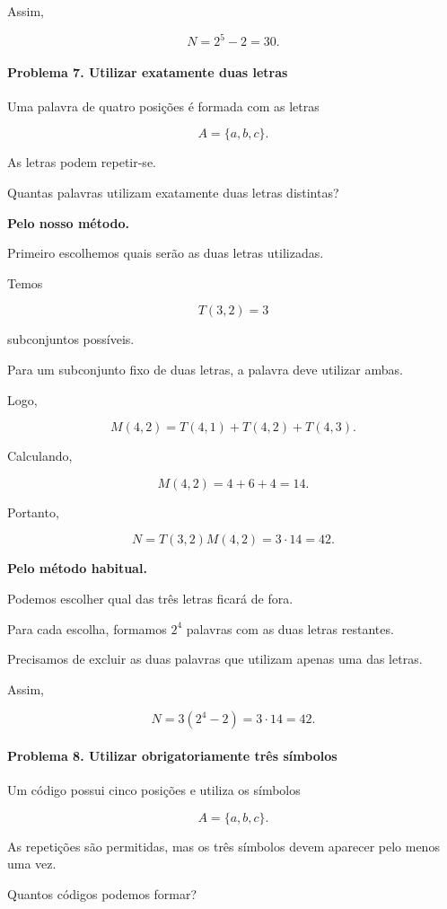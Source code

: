 \documentclass[11pt,a4paper,oneside]{book}
\begin{document}
Assim,

\[
N=2^5-2=\boxed{30}.
\]

\paragraph{Problema 7. Utilizar exatamente duas letras}

Uma palavra de quatro posições é formada
com as letras

\[
A=\{a,b,c\}.
\]

As letras podem repetir-se.

Quantas palavras utilizam exatamente
duas letras distintas?

\textbf{Pelo nosso método.}

Primeiro escolhemos quais serão
as duas letras utilizadas.

Temos

\[
T(3,2)=3
\]

subconjuntos possíveis.

Para um subconjunto fixo de duas letras,
a palavra deve utilizar ambas.

Logo,

\[
M(4,2)=T(4,1)+T(4,2)+T(4,3).
\]

Calculando,

\[
M(4,2)=4+6+4=14.
\]

Portanto,

\[
N=T(3,2)M(4,2)=3\cdot14=\boxed{42}.
\]

\textbf{Pelo método habitual.}

Podemos escolher qual das três letras
ficará de fora.

Para cada escolha, formamos $2^4$
palavras com as duas letras restantes.

Precisamos de excluir as duas palavras
que utilizam apenas uma das letras.

Assim,

\[
N=3(2^4-2)=3\cdot14=\boxed{42}.
\]

\paragraph{Problema 8. Utilizar obrigatoriamente três símbolos}

Um código possui cinco posições
e utiliza os símbolos

\[
A=\{a,b,c\}.
\]

As repetições são permitidas,
mas os três símbolos devem aparecer
pelo menos uma vez.

Quantos códigos podemos formar?
\end{document}
